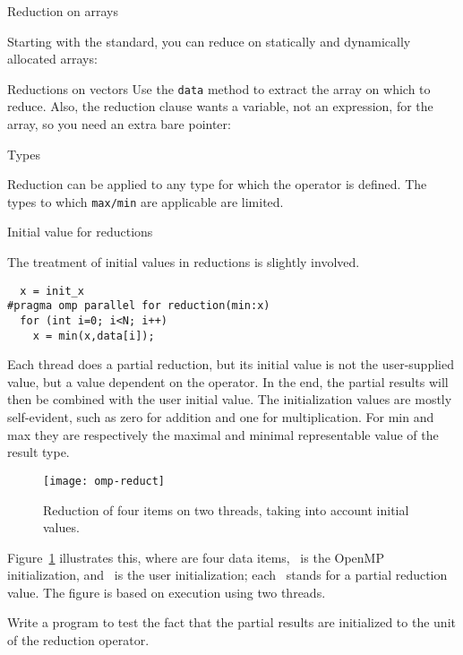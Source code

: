  {Reduction on arrays}
\label{sec:omp-array-reduct}

Starting with the  standard, you can reduce
on statically and dynamically allocated arrays:

\begin{cppnote}{Reductions on vectors}
  Use the \lstinline{data} method to extract the array
  on which to reduce.
  Also, the reduction clause wants a variable, not an expression,
  for the array, so you need an extra bare pointer:
\end{cppnote}

 {Types}

Reduction can be applied to any type for which the operator is defined.
The types to which \lstinline{max/min} are applicable are limited.

 {Initial value for reductions}

The treatment of initial values in reductions is slightly involved.
\begin{lstlisting}
  x = init_x
#pragma omp parallel for reduction(min:x)
  for (int i=0; i<N; i++)
    x = min(x,data[i]);
\end{lstlisting}
Each thread does a partial reduction, but its initial value is not the
user-supplied  value, but a value dependent on the
operator. In the end, the partial results will then be combined with
the user initial value.
The initialization values are mostly self-evident, such as zero for
addition and one for multiplication. For min and max they are
respectively the maximal and minimal representable value of the result type.

\begin{figure}[ht]
  \texttt{[image: omp-reduct]}
  \caption{Reduction of four items on two threads, taking into account
    initial values.}
  \label{fig:omp-reduct}  
\end{figure}
%
Figure~\ref{fig:omp-reduct} illustrates this, where  are
four data items, ~is the OpenMP initialization, and ~is the
user initialization; each ~stands for a partial reduction value.
The figure is based on execution using two threads.

\begin{exercise}
  Write a program to test the fact that the partial results
  are initialized to the unit of the reduction operator.
\end{exercise}

